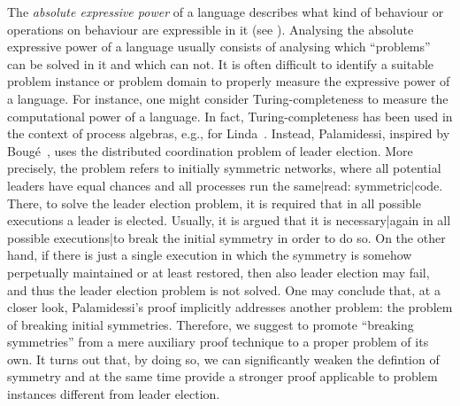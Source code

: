 \documentclass[11pt,techReport]{eptcs}
\begin{document}
The \emph{absolute expressive power} of a language describes what kind of behaviour or operations on behaviour are expressible in it (see \cite{parrow08,gorla08, gorla08d}). Analysing the absolute expressive power of a language usually consists of analysing which ``problems'' can be solved in it and which can not.  
It is often difficult to identify a suitable problem instance or problem domain to properly measure the expressive power of a language.  For instance, one might consider Turing-completeness to measure the computational power of a language.  In fact, Turing-completeness has been used in the context of process algebras, e.g., for Linda~\cite{busi00:_expres_of_linda_coord_primit}.   Instead, Palamidessi, inspired by Boug{\'e}~\cite{bouge88}, uses the distributed coordination problem of leader election.
More precisely, the problem refers to initially symmetric networks, where all potential leaders have equal chances and all processes run the same|read: symmetric|code.  There, to solve the leader election problem, it is required that in all possible executions a leader is elected.  Usually, it is argued that it is necessary|again in all possible executions|to break the initial symmetry in order to do so.  On the other hand, if there is just a single execution in which the symmetry is somehow perpetually maintained or at least restored, then also leader election may fail, and thus the leader election problem is not solved.
One may conclude that, at a closer look, Palamidessi's proof implicitly addresses another problem: the problem of breaking initial symmetries.  
Therefore, we suggest to promote ``breaking symmetries'' from a mere auxiliary proof technique to a proper problem of its own.  It turns out that, by doing so, we can significantly weaken the defintion of symmetry and at the same time provide a stronger proof applicable to problem instances different from leader election.
\end{document}
